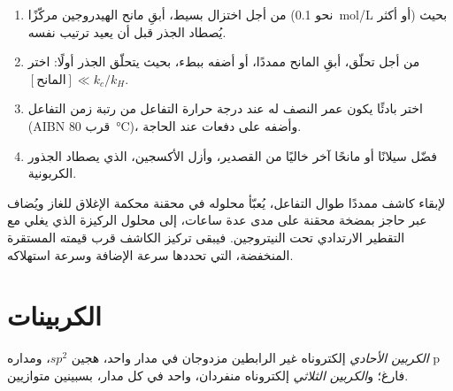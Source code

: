 \begin{method}\label{met:b3:radicals-carbenes:radical-chain}
\begin{enumerate}
  \item من أجل اختزال بسيط، أبقِ مانح الهيدروجين مركّزًا (نحو
        \qty{0.1}{mol/L} أو أكثر) بحيث يُصطاد الجذر قبل أن يعيد ترتيب نفسه.
  \item من أجل تحلّق، أبقِ المانح ممددًا، أو أضفه ببطء، بحيث
        يتحلّق الجذر أولًا: اختر $[\text{المانح}] \ll k_c/k_H$.
  \item اختر بادئًا يكون عمر النصف له عند درجة حرارة التفاعل من
        رتبة زمن التفاعل (AIBN قرب \qty{80}{\celsius})، وأضفه على دفعات عند
        الحاجة.
  \item فضّل سيلانًا أو مانحًا آخر خاليًا من القصدير، وأزل الأكسجين، الذي يصطاد
        الجذور الكربونية.
\end{enumerate}
\end{method}

\begin{inthelab}
لإبقاء كاشف ممددًا طوال التفاعل، يُعبّأ محلوله في
محقنة محكمة الإغلاق للغاز ويُضاف عبر حاجز بمضخة محقنة على مدى عدة
ساعات، إلى محلول الركيزة الذي يغلي مع التقطير الارتدادي تحت النيتروجين. فيبقى
تركيز الكاشف قرب قيمته المستقرة المنخفضة، التي تحددها
سرعة الإضافة وسرعة استهلاكه.
\end{inthelab}

\section{الكربينات}

\begin{definition}\label{def:b3:radicals-carbenes:carbene-states}
\emph{الكربين الأحادي} إلكتروناه غير الرابطين
مزدوجان في مدار واحد، هجين $sp^2$، ومداره p فارغ؛ 
و\emph{الكربين الثلاثي} إلكتروناه منفردان، واحد في كل
مدار، بسبينين متوازيين.
\end{definition}

